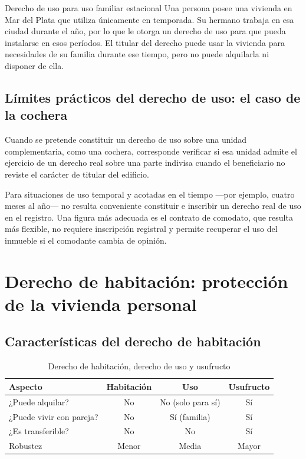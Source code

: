 \documentclass[12pt,oneside]{book}
\begin{document}
\begin{example}{Derecho de uso para uso familiar estacional}
Una persona posee una vivienda en Mar del Plata que utiliza únicamente en temporada. Su hermano trabaja en esa ciudad durante el año, por lo que le otorga un derecho de uso para que pueda instalarse en esos períodos. El titular del derecho puede usar la vivienda para necesidades de su familia durante ese tiempo, pero no puede alquilarla ni disponer de ella.
\end{example}

\subsection{Límites prácticos del derecho de uso: el caso de la cochera}

Cuando se pretende constituir un derecho de uso sobre una unidad complementaria, como una cochera, corresponde verificar si esa unidad admite el ejercicio de un derecho real sobre una parte indivisa cuando el beneficiario no reviste el carácter de titular del edificio.

\begin{note}
Para situaciones de uso temporal y acotadas en el tiempo —por ejemplo, cuatro meses al año— no resulta conveniente constituir e inscribir un derecho real de uso en el registro. Una figura más adecuada es el contrato de comodato, que resulta más flexible, no requiere inscripción registral y permite recuperar el uso del inmueble si el comodante cambia de opinión.
\end{note}

\section{Derecho de habitación: protección de la vivienda personal}

\subsection{Características del derecho de habitación}

\begin{table}[H]
\centering
\caption{Derecho de habitación, derecho de uso y usufructo}
\begin{tabularx}{\textwidth}{>{\raggedright\arraybackslash}X c c c}
\toprule
\textbf{Aspecto} & \textbf{Habitación} & \textbf{Uso} & \textbf{Usufructo} \\
\midrule
¿Puede alquilar? & No & No (solo para sí) & Sí \\
¿Puede vivir con pareja? & No & Sí (familia) & Sí \\
¿Es transferible? & No & No & Sí \\
Robustez & Menor & Media & Mayor \\
\bottomrule
\end{tabularx}
\end{table}
\end{document}
